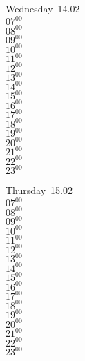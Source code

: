 \documentclass[11pt, a4paper]{book}\usepackage[]{graphicx}\usepackage[]{color}
\begin{document}
\begin{weekdaybox}
  Wednesday~14.02\\
  { 
  \vfill
  $07^{00}$\\
$08^{00}$\\
$09^{00}$\\
$10^{00}$\\
$11^{00}$\\
$12^{00}$\\
$13^{00}$\\
$14^{00}$\\
$15^{00}$\\
$16^{00}$\\
$17^{00}$\\
$18^{00}$\\
$19^{00}$\\
$20^{00}$\\
$21^{00}$\\
$22^{00}$\\
$23^{00}$\\
  }
\end{weekdaybox}
\clearpage
\begin{headerbox}
\end{headerbox}
\begin{weekdaybox}
  Thursday~15.02\\
  { 
  \vfill
  $07^{00}$\\
$08^{00}$\\
$09^{00}$\\
$10^{00}$\\
$11^{00}$\\
$12^{00}$\\
$13^{00}$\\
$14^{00}$\\
$15^{00}$\\
$16^{00}$\\
$17^{00}$\\
$18^{00}$\\
$19^{00}$\\
$20^{00}$\\
$21^{00}$\\
$22^{00}$\\
$23^{00}$\\
  }
\end{weekdaybox} 
\end{document}
